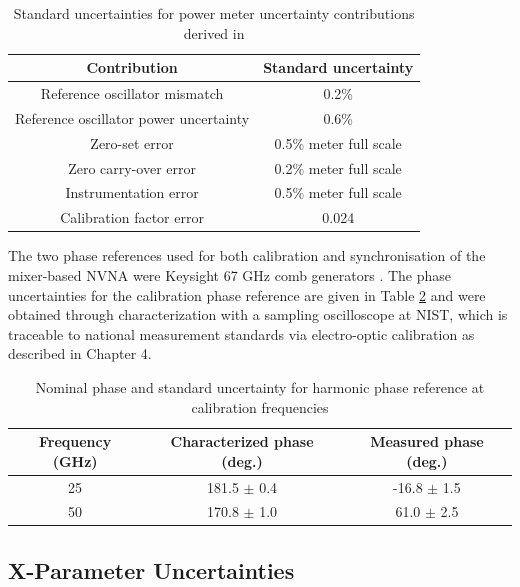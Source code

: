 \documentclass[../thesis/thesis.tex]{subfiles}
\begin{document}
\begin{table}[]
	\centering
	\caption{Standard uncertainties for power meter uncertainty contributions derived in \cite{Keysight_2017}}
	\label{ch5_table_powerunc}
	\begin{tabular}{cc}
		\hline
		Contribution                           & Standard uncertainty \\ \hline
		Reference oscillator mismatch          & 0.2\%                \\
		Reference oscillator power uncertainty & 0.6\%                \\
		Zero-set error                         & 0.5\% meter full scale \\
		Zero carry-over error                  & 0.2\% meter full scale \\
		Instrumentation error                  & 0.5\% meter full scale \\
		Calibration factor error               & 0.024               \\ \hline
	\end{tabular}
\end{table}

The two phase references used for both calibration and synchronisation of the mixer-based NVNA were Keysight 67 GHz comb generators \cite{Keysight_2014}. The phase uncertainties for the calibration phase reference are given in Table \ref{ch5_table_phaseunc} and were obtained through characterization with a sampling oscilloscope at NIST, which is traceable to national measurement standards via electro-optic calibration \cite{Reader_2008, Hale_2009} as described in Chapter 4.

\begin{table}[]
	\centering
	\caption{Nominal phase and standard uncertainty for harmonic phase reference at calibration frequencies}
	\label{ch5_table_phaseunc}
	\begin{tabular}{ccc}
		\hline
		Frequency (GHz) & Characterized phase (deg.) & Measured phase (deg.)\\ \hline
		25 & 181.5 $\pm$ 0.4 & -16.8 $\pm$ 1.5 \\ 
		50 & 170.8 $\pm$ 1.0 & 61.0 $\pm$ 2.5 \\ 
		\hline
	\end{tabular}
\end{table}

\subsection{X-Parameter Uncertainties}
\end{document}

